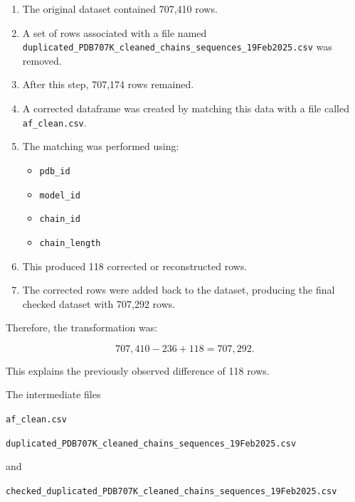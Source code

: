 \documentclass[11pt,a4paper]{article}
\begin{document}
\begin{enumerate}[leftmargin=*]

    \item The original dataset contained 707,410 rows.

    \item A set of rows associated with a file named
    \texttt{duplicated\_PDB707K\_cleaned\_chains\_sequences\_19Feb2025.csv}
    was removed.

    \item After this step, 707,174 rows remained.

    \item A corrected dataframe was created by matching this data with a file called \texttt{af\_clean.csv}.

    \item The matching was performed using:

    \begin{itemize}
        \item \texttt{pdb\_id}
        \item \texttt{model\_id}
        \item \texttt{chain\_id}
        \item \texttt{chain\_length}
    \end{itemize}

    \item This produced 118 corrected or reconstructed rows.

    \item The corrected rows were added back to the dataset, producing the final checked dataset with 707,292 rows.

\end{enumerate}

Therefore, the transformation was:

\[
707{,}410 - 236 + 118 = 707{,}292.
\]

This explains the previously observed difference of 118 rows.

The intermediate files

\begin{center}
\texttt{af\_clean.csv}
\end{center}

\begin{center}
\texttt{duplicated\_PDB707K\_cleaned\_chains\_sequences\_19Feb2025.csv}
\end{center}

and

\begin{center}
\texttt{checked\_duplicated\_PDB707K\_cleaned\_chains\_sequences\_19Feb2025.csv}
\end{center}
\end{document}

